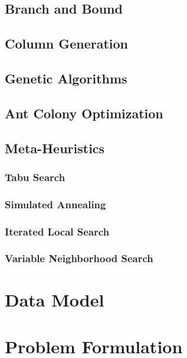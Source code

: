 \subsection{Branch and Bound}
\subsection{Column Generation}
\subsection{Genetic Algorithms}
\subsection{Ant Colony Optimization}


\subsection{Meta-Heuristics}
\subsubsection{Tabu Search}
\subsubsection{Simulated Annealing}
\subsubsection{Iterated Local Search}
\subsubsection{Variable Neighborhood Search}

\section{Data Model}

\section{Problem Formulation}




